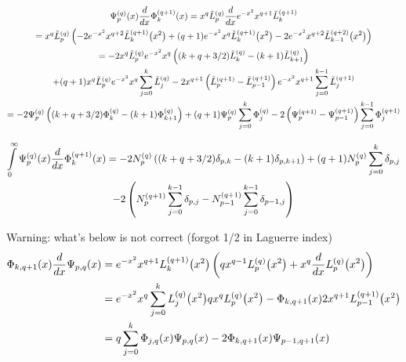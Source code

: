 \documentclass{article}[draft]
\begin{document}

\begin{multline*}
\tfun{q}{p}\of{x} \frac{d}{dx} \bfun{q+1}{k}\of{x} 
= x^q \lph{q}{p} \frac{d}{dx} e^{-x^2} x^{q+1} \lph{q+1}{k}
\\
= x^q \lph{q}{p} \left( 
- 2 e^{-x^2} x^{q+2} \lph{q+1}{k}\of{x^2}
+ (q+1) e^{-x^2} x^{q} \lph{q+1}{k}\of{x^2}
- 2 e^{-x^2} x^{q+2} \lph{q+2}{k-1}\of{x^2}
\right)
\\ 
= 
-2 x^q \lph{q}{p} e^{-x^2} x^q \left( (k+q+3/2) \lph{q}{k} - (k+1) \lph{q}{k+1} \right) 
\\
+ (q+1) x^q \lph{q}{p} e^{-x^2} x^q \sum_{j=0}^{k} \lph{q}{j}
-2 x^{q+1} \left( \lph{q+1}{p} - \lph{q+1}{p-1} \right) e^{-x^2} x^{q+1} \sum_{j=0}^{k-1} \lph{q+1}{j}
\\ 
= 
-2 \tfun{q}{p} \left( (k+q+3/2) \bfun{q}{k} - (k+1) \bfun{q}{k+1} \right) 
+ (q+1)\tfun{q}{p} \sum_{j=0}^{k} \bfun{q}{j}
-2\left( \tfun{q+1}{p} - \tfun{q+1}{p-1} \right) \sum_{j=0}^{k-1} \bfun{q+1}{j}
\end{multline*}


\begin{multline*}
\myint_0^\infty \tfun{q}{p}\of{x} \frac{d}{dx} \bfun{q+1}{k}\of{x} 
= 
-2 \nfun{q}{p} \left( (k+q+3/2)\delta_{p,k} - (k+1) \delta_{p,k+1} \right) 
+ (q+1)\nfun{q}{p} \sum_{j=0}^{k} \delta_{p,j}
\\
-2\left( \nfun{q+1}{p} \sum_{j=0}^{k-1} \delta_{p,j} - \nfun{q+1}{p-1} \sum_{j=0}^{k-1} \delta_{p-1,j} \right)  
\end{multline*}

Warning: what's below is not correct (forgot 1/2 in Laguerre index)
\begin{align*}
\Phi_{k,q+1}\of{x} \frac{d}{dx}\Psi_{p,q}\of{x} 
&= 
e^{-x^2} x^{q+1} L^{(q+1)}_k\of{x^2}
\left(
q x^{q-1} L^{(q)}_p\of{x^2}
+ x^{q} \frac{d}{dx} L^{(q)}_p\of{x^2}
\right)
\\
&= e^{-x^2} x^{q} \sum_{j=0}^{k} \lp{q}{j}\of{x^2} q x^{q} L^{(q)}_p\of{x^2}
- \Phi_{k,q+1}\of{x} 2 x^{q+1} L^{(q+1)}_{p-1}\of{x^2}
\\
&= q \sum_{j=0}^{k} \Phi_{j,q}\of{x} \Psi_{p,q}\of{x}
- 2\Phi_{k,q+1}\of{x} \Psi_{p-1,q+1}\of{x}
\end{align*}
\end{document}
